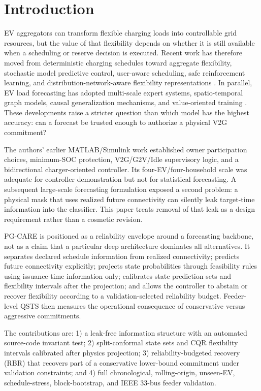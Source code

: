 \documentclass[journal]{IEEEtran}
\begin{document}
\section{Introduction}
EV aggregators can transform flexible charging loads into controllable grid resources, but the value of that flexibility depends on whether it is still available when a scheduling or reserve decision is executed. Recent work has therefore moved from deterministic charging schedules toward aggregate flexibility, stochastic model predictive control, user-aware scheduling, safe reinforcement learning, and distribution-network-aware flexibility representations \cite{r12,r17,r18,r26,r27,r28,r29,r37,r38,r39}. In parallel, EV load forecasting has adopted multi-scale expert systems, spatio-temporal graph models, causal generalization mechanisms, and value-oriented training \cite{r11,r19,r20,r21,r22,r30,r40}. These developments raise a stricter question than which model has the highest accuracy: can a forecast be trusted enough to authorize a physical V2G commitment?

The authors' earlier MATLAB/Simulink work \cite{r1} established owner participation choices, minimum-SOC protection, V2G/G2V/Idle supervisory logic, and a bidirectional charger-oriented controller. Its four-EV/four-household scale was adequate for controller demonstration but not for statistical forecasting. A subsequent large-scale forecasting formulation exposed a second problem: a physical mask that uses realized future connectivity can silently leak target-time information into the classifier. This paper treats removal of that leak as a design requirement rather than a cosmetic revision.

PG-CARE is positioned as a reliability envelope around a forecasting backbone, not as a claim that a particular deep architecture dominates all alternatives. It separates declared schedule information from realized connectivity; predicts future connectivity explicitly; projects state probabilities through feasibility rules using issuance-time information only; calibrates state prediction sets and flexibility intervals after the projection; and allows the controller to abstain or recover flexibility according to a validation-selected reliability budget. Feeder-level QSTS then measures the operational consequence of conservative versus aggressive commitments.

The contributions are: 1) a leak-free information structure with an automated source-code invariant test; 2) split-conformal state sets and CQR flexibility intervals calibrated after physics projection; 3) reliability-budgeted recovery (RBR) that recovers part of a conservative lower-bound commitment under validation constraints; and 4) full chronological, rolling-origin, unseen-EV, schedule-stress, block-bootstrap, and IEEE 33-bus feeder validation.
\end{document}
